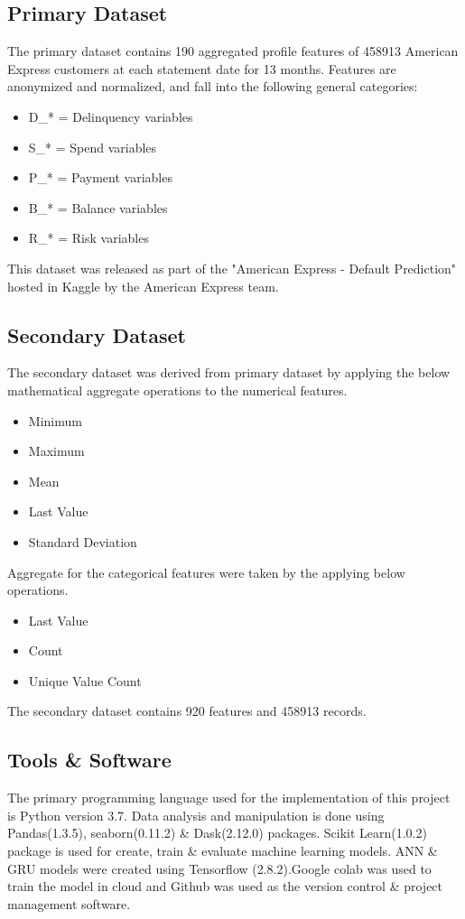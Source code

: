 \documentclass[twoside,11pt,a4paper]{article}
\begin{document}
\subsection{Primary Dataset}
The primary dataset contains 190 aggregated profile features of 458913 American Express customers at each statement date for 13 months. Features are anonymized and normalized, and fall into the following general categories:

\begin{itemize}
	\item D\_* = Delinquency variables
	\item S\_* = Spend variables
	\item P\_* = Payment variables
	\item B\_* = Balance variables
	\item R\_* = Risk variables	
\end{itemize}

This dataset\citep{amex-default-prediction-dataset} was released as part of the "American Express - Default Prediction" hosted in Kaggle by the American Express team.

\subsection{Secondary Dataset}
The secondary dataset was derived from primary dataset by applying the below mathematical aggregate operations to the numerical features.
\begin{itemize}
	\item Minimum 
	\item Maximum
	\item Mean
	\item Last Value
	\item Standard Deviation
\end{itemize}

Aggregate for the categorical features were taken by the applying below operations.
\begin{itemize}
	\item Last Value
	\item Count
	\item Unique Value Count
\end{itemize}

The secondary dataset contains 920 features and 458913 records.

\subsection{Tools \& Software}
The primary programming language used for the implementation of this project is Python version 3.7. Data analysis and manipulation is done using Pandas(1.3.5), seaborn(0.11.2) \& Dask(2.12.0) packages. Scikit Learn(1.0.2) package is used for create, train \& evaluate machine learning models. \acs{ANN} \& \acs{GRU} models were created using Tensorflow (2.8.2).Google colab was used to train the model in cloud and Github was used as the version control \& project management software.
\end{document}
